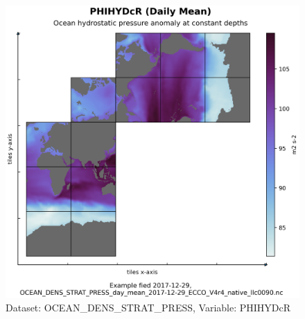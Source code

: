 \begin{figure}[H]
\centering
\includegraphics[scale=0.55]{../images/plots/native_plots/Ocean_Density_Stratification_and_Hydrostatic_Pressure/PHIHYDcR.png}
\caption{Dataset: OCEAN\_DENS\_STRAT\_PRESS, Variable: PHIHYDcR}
\label{tab:table-OCEAN_DENS_STRAT_PRESS_PHIHYDcR-Plot}
\end{figure}
\pagebreak

